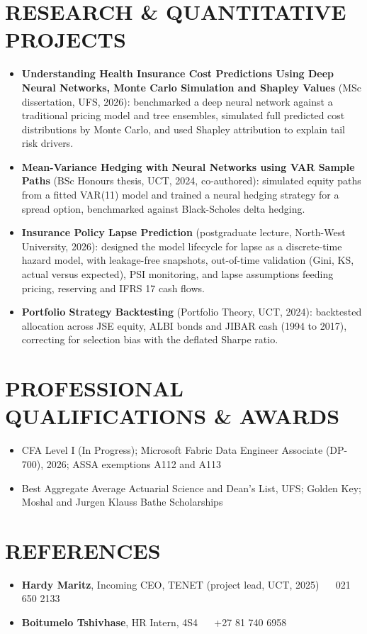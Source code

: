 \documentclass[letterpaper,11pt]{article}
\newcommand{\resumeItem}[1]{
  \item\small{
    {#1 \vspace{-1pt}}
  }
}
\newcommand{\resumeItemListStart}{\begin{itemize}[leftmargin=0.1in]}
\newcommand{\resumeItemListEnd}{\end{itemize}\vspace{-5pt}}
\begin{document}
\section{RESEARCH \& QUANTITATIVE PROJECTS}
\vspace{4pt}
\resumeItemListStart
    \resumeItem{\small{\textbf{Understanding Health Insurance Cost Predictions Using Deep Neural Networks, Monte Carlo Simulation and Shapley Values} (MSc dissertation, UFS, 2026): benchmarked a deep neural network against a traditional pricing model and tree ensembles, simulated full predicted cost distributions by Monte Carlo, and used Shapley attribution to explain tail risk drivers.}}
    \resumeItem{\small{\textbf{Mean-Variance Hedging with Neural Networks using VAR Sample Paths} (BSc Honours thesis, UCT, 2024, co-authored): simulated equity paths from a fitted VAR(11) model and trained a neural hedging strategy for a spread option, benchmarked against Black-Scholes delta hedging.}}
    \resumeItem{\small{\textbf{Insurance Policy Lapse Prediction} (postgraduate lecture, North-West University, 2026): designed the model lifecycle for lapse as a discrete-time hazard model, with leakage-free snapshots, out-of-time validation (Gini, KS, actual versus expected), PSI monitoring, and lapse assumptions feeding pricing, reserving and IFRS 17 cash flows.}}
    \resumeItem{\small{\textbf{Portfolio Strategy Backtesting} (Portfolio Theory, UCT, 2024): backtested allocation across JSE equity, ALBI bonds and JIBAR cash (1994 to 2017), correcting for selection bias with the deflated Sharpe ratio.}}
\resumeItemListEnd
\vspace{-4pt}

\section{PROFESSIONAL QUALIFICATIONS \& AWARDS}
\vspace{4pt}
\resumeItemListStart
    \resumeItem{\small{CFA Level I (In Progress); Microsoft Fabric Data Engineer Associate (DP-700), 2026; ASSA exemptions A112 and A113}}
    \vspace{-3pt}
    \resumeItem{\small{Best Aggregate Average Actuarial Science and Dean's List, UFS; Golden Key; Moshal and Jurgen Klauss Bathe Scholarships}}
\resumeItemListEnd

\section{REFERENCES}
\vspace{4pt}
\resumeItemListStart
    \resumeItem{\small{\textbf{Hardy Maritz}, Incoming CEO, TENET (project lead, UCT, 2025) ~\textbar~ 021 650 2133 ~\textbar~ \href{mailto:hardy.maritz@uct.ac.za}{\color{blue}{hardy.maritz@uct.ac.za}}}}
    \vspace{-3pt}
    \resumeItem{\small{\textbf{Boitumelo Tshivhase}, HR Intern, 4S4 ~\textbar~ +27 81 740 6958 ~\textbar~ \href{mailto:boitumelotshivhase@icloud.com}{\color{blue}{boitumelotshivhase@icloud.com}}}}
\resumeItemListEnd
\end{document}
